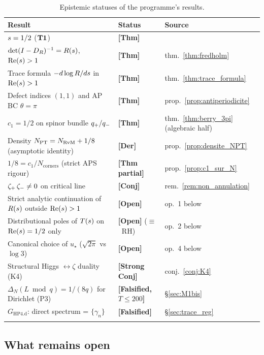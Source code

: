 \begin{longtable}{@{}p{8cm}p{2.5cm}p{4cm}@{}}
\toprule
\textbf{Result} & \textbf{Status} & \textbf{Source}\\
\midrule
\endhead
$s = 1/2$ ($\textbf{T1}$) & \textbf{[Thm]} & \cite{PT_M1}\\
$\det(I - D_R)^{-1} = R(s)$, $\operatorname{Re}(s) > 1$ & \textbf{[Thm]} & thm.~\ref{thm:fredholm}\\
Trace formula $-d\log R/ds$ in $\operatorname{Re}(s) > 1$ & \textbf{[Thm]} & thm.~\ref{thm:trace_formula}\\
Defect indices $(1,1)$ and AP BC $\theta = \pi$ & \textbf{[Thm]} & prop.~\ref{prop:antiperiodicite}\\
$c_1 = 1/2$ on spinor bundle $q_{+}/q_{-}$ & \textbf{[Thm]} & thm.~\ref{thm:berry_3pi} (algebraic half)\\
Density $N_{\mathrm{PT}} = N_{\mathrm{RvM}} + 1/8$ (asymptotic identity) & \textbf{[Der]} & prop.~\ref{prop:densite_NPT}\\
$1/8 = c_1/N_{\mathrm{corners}}$ (strict APS rigour) & \textbf{[Thm partial]} & prop.~\ref{prop:c1_sur_N}\\
$\zeta_{+}\,\zeta_{-} \ne 0$ on critical line & \textbf{[Conj]} & rem.~\ref{rem:non_annulation}\\
Strict analytic continuation of $R(s)$ outside $\operatorname{Re}(s) > 1$ & \textbf{[Open]} & op.~1 below\\
Distributional poles of $T(s)$ on $\operatorname{Re}(s) = 1/2$ only & \textbf{[Open]} ($\equiv$~RH) & op.~2 below\\
Canonical choice of $u_\star$ ($\sqrt{2\pi}$ vs $\log 3$) & \textbf{[Open]} & op.~4 below\\
Structural Higgs $\leftrightarrow \zeta$ duality (K4) & \textbf{[Strong Conj]} & conj.~\ref{conj:K4}\\
$\Delta_N(L \bmod q) = 1/(8q)$ for Dirichlet (P3) & \textbf{[Falsified, $T \le 200$]} & \S\ref{sec:M1bis}\\
$G_{\mathrm{HP4.d}}$: direct spectrum = $\{\gamma_n\}$ & \textbf{[Falsified]} & \S\ref{sec:trace_reg}\\
\bottomrule
\caption{Epistemic statuses of the programme's results.}
\label{tab:statuts}
\end{longtable}

\subsection{What remains open}
\label{sec:ouvertures}

